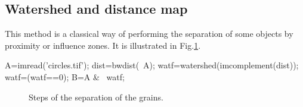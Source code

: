 \def\QRCODE{MASTER_mispa_TUT.IMG.image_segmentation_watershed_matlabqrcode.png}
\def\QRPAGE{http://www.iptutorials.science/tree/master/MASTER_mispa/TUT.IMG.image_segmentation_watershed/matlab}

\subsection{Watershed and distance map}
This method is a classical way of performing the separation of some objects by proximity or influence zones. It is illustrated in Fig.\ref{fig:watershed:matlab:dm}.

\begin{matlab}
A=imread('circles.tif');
dist=bwdist(~A);
watf=watershed(imcomplement(dist));
watf=(watf==0);
B=A & ~watf;
\end{matlab}

\begin{figure}[htbp]
 \centering
 \hfill
 \hfill
 \caption{Steps of the separation of the grains.}
 \label{fig:watershed:matlab:dm}
\end{figure}

